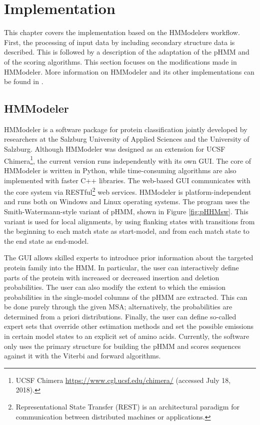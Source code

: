 \chapter{Implementation}
\label{ch:implement}

This chapter covers the implementation based on the HMModelers workflow. First, the processing of input data by including secondary structure data is described. This is followed by a description of the adaptation of the \ac{pHMM} and of the scoring algorithms. This section focuses on the modifications made in HMModeler. More information on HMModeler and its other implementations can be found in \cite{Graf.2011, MathiasOberkirchner.2014, Mayer.2014}.

\section{HMModeler}

HMModeler is a software package for protein classification jointly developed by researchers at the Salzburg University of Applied Sciences and the University of Salzburg. 
Although HMModeler was designed as an extension for UCSF Chimera\footnote{UCSF Chimera \url{https://www.cgl.ucsf.edu/chimera/} (accessed July 18, 2018).}, the current version runs independently with its own \ac{GUI}. The core of HMModeler is written in Python, while time-consuming algorithms are also implemented with faster C++ libraries. The  web-based \ac{GUI} communicates with the core system via RESTful\footnote{Representational State Transfer (REST) is an architectural paradigm for communication between distributed machines or applications.} web services. HMModeler is platform-independent and runs both on Windows and Linux operating systems. 
The program uses the Smith-Watermann-style variant of \ac{pHMM}, shown in Figure \ref{fig:pHHMsw}. This variant is used for local alignments, by using flanking states with transitions from the beginning to each match state as start-model, and from each match state to the end state as end-model. 

The \ac{GUI} allows skilled experts to introduce prior information about the targeted protein family into the \ac{HMM}. In particular, the user can interactively define parts of the protein with increased or decreased insertion and deletion probabilities. The user can also modify the extent to which the emission probabilities in the single-model columns of the \ac{pHMM} are extracted. This can be done purely through the given \ac{MSA}; alternatively, the probabilities are determined from a priori distributions.
Finally, the user can define so-called expert sets that override other estimation methods and set the possible emissions in certain model states to an explicit set of amino acids. Currently, the software only uses the primary structure for building the \ac{pHMM} and scores sequences against it with the Viterbi and forward algorithms.
 



